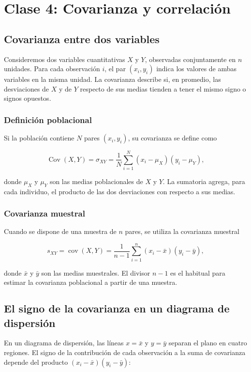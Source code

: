 \chapter{Clase 4: Covarianza y correlación}

\section{Covarianza entre dos variables}

Consideremos dos variables cuantitativas $X$ y $Y$, observadas conjuntamente en $n$ unidades. Para cada observación $i$, el par $(x_i,y_i)$ indica los valores de ambas variables en la misma unidad. La covarianza describe si, en promedio, las desviaciones de $X$ y de $Y$ respecto de sus medias tienden a tener el mismo signo o signos opuestos.

\subsection{Definición poblacional}

Si la población contiene $N$ pares $(x_i,y_i)$, su covarianza se define como

$$
\operatorname{Cov}(X,Y) = \sigma_{XY} = \frac{1}{N}\sum_{i=1}^{N}(x_i-\mu_X)(y_i-\mu_Y),
$$

donde $\mu_X$ y $\mu_Y$ son las medias poblacionales de $X$ y $Y$. La sumatoria agrega, para cada individuo, el producto de las dos desviaciones con respecto a sus medias.

\subsection{Covarianza muestral}

Cuando se dispone de una muestra de $n$ pares, se utiliza la covarianza muestral

$$
s_{XY} = \operatorname{cov}(X,Y) = \frac{1}{n-1}\sum_{i=1}^{n}(x_i-\bar{x})(y_i-\bar{y}),
$$

donde $\bar{x}$ y $\bar{y}$ son las medias muestrales. El divisor $n-1$ es el habitual para estimar la covarianza poblacional a partir de una muestra.

\section{El signo de la covarianza en un diagrama de dispersión}

En un diagrama de dispersión, las líneas $x=\bar{x}$ y $y=\bar{y}$ separan el plano en cuatro regiones. El signo de la contribución de cada observación a la suma de covarianza depende del producto $(x_i-\bar{x})(y_i-\bar{y})$:

